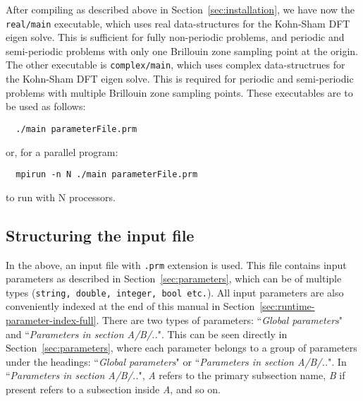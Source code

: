 After compiling \dftfe{} as described above in Section~\ref{sec:installation}, we have now the \verb|real/main| executable, which uses real data-structures for the Kohn-Sham DFT eigen solve. This is sufficient for fully non-periodic problems, and periodic and semi-periodic problems with only one Brillouin zone sampling point at the origin. The other executable is \verb|complex/main|, which uses complex data-structrues for the Kohn-Sham DFT eigen solve. This is required for periodic and semi-periodic problems with multiple Brillouin zone sampling points. These executables are to be used as follows:
\begin{verbatim}
  ./main parameterFile.prm
\end{verbatim}
or, for a parallel program:
\begin{verbatim}
  mpirun -n N ./main parameterFile.prm
\end{verbatim}
to run with N processors. 
\subsection{Structuring the input file}
In the above, an input file with \verb|.prm| extension is used. This file contains input parameters as described in Section~\ref{sec:parameters}, which can be of multiple types (\verb|string, double, integer, bool etc.|). All input parameters are also conveniently indexed at the end of this manual in Section~\ref{sec:runtime-parameter-index-full}. There are two types of parameters: ``{\it Global parameters}" and ``{\it Parameters in section A/B/..}". This can be seen directly in Section~\ref{sec:parameters}, where each parameter belongs to a group of parameters under the headings: ``{\it Global parameters}" or ``{\it Parameters in section A/B/..}". In ``{\it Parameters in section A/B/..}", {\it A} refers to the primary subsection name, {\it B} if present refers to a subsection inside {\it A}, and so on. 

